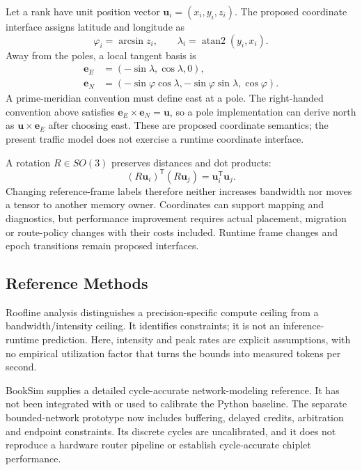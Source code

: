 \documentclass[11pt,a4paper]{article}
\begin{document}
Let a rank have unit position vector $\mathbf{u}_i=(x_i,y_i,z_i)$. The proposed
coordinate interface assigns latitude and longitude as
\begin{equation}
\varphi_i=\arcsin z_i,\qquad
\lambda_i=\operatorname{atan2}(y_i,x_i).
\end{equation}
Away from the poles, a local tangent basis is
\begin{align}
\mathbf{e}_E&=(-\sin\lambda,\cos\lambda,0),\\
\mathbf{e}_N&=(-\sin\varphi\cos\lambda,
              -\sin\varphi\sin\lambda,\cos\varphi).
\end{align}
A prime-meridian convention must define east at a pole. The right-handed
convention above satisfies $\mathbf{e}_E\times\mathbf{e}_N=\mathbf{u}$, so a
pole implementation can derive north as $\mathbf{u}\times\mathbf{e}_E$ after
choosing east. These are proposed coordinate semantics; the present traffic
model does not exercise a runtime coordinate interface.

A rotation $R\in SO(3)$ preserves distances and dot products:
\begin{equation}
(R\mathbf{u}_i)^{\mathsf T}(R\mathbf{u}_j)
=\mathbf{u}_i^{\mathsf T}\mathbf{u}_j.
\end{equation}
Changing reference-frame labels therefore neither increases bandwidth nor
moves a tensor to another memory owner. Coordinates can support mapping and
diagnostics, but performance improvement requires actual placement,
migration or route-policy changes with their costs included. Runtime frame
changes and epoch transitions remain proposed interfaces.

\subsection{Reference Methods}

Roofline analysis distinguishes a precision-specific compute ceiling from a
bandwidth/intensity ceiling\cite{williams2009roofline}. It identifies
constraints; it is not an inference-runtime prediction. Here, intensity and
peak rates are explicit assumptions, with no empirical utilization factor
that turns the bounds into measured tokens per second.

BookSim supplies a detailed cycle-accurate network-modeling
reference\cite{jiang2013booksim,booksimrepo}. It has not been integrated with
or used to calibrate the Python baseline. The separate bounded-network
prototype now includes buffering, delayed credits, arbitration and endpoint
constraints. Its discrete cycles are uncalibrated, and it does not reproduce
a hardware router pipeline or establish cycle-accurate chiplet performance.
\end{document}
